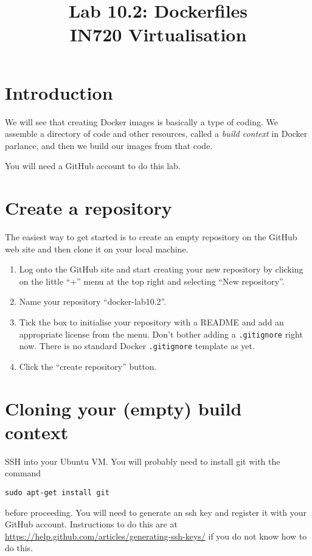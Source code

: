 \documentclass{article}
\begin{document}
\title{Lab 10.2: Dockerfiles\\ IN720 Virtualisation}
\date{}
\maketitle

\section*{Introduction}
We will  see that creating Docker images is basically a type of coding.  We assemble a directory of code and other resources, called a \emph{build context} in Docker parlance, and then we build our images from that code.  

You will need a GitHub account to do this lab.

\section{Create a repository}
The easiest way to get started is to create an empty repository on the GitHub web site and then clone it on your local machine.  
\begin{enumerate}
	\item Log onto the GitHub site and start creating your new repository by clicking on the little ``+'' menu at the top right and selecting ``New repository''.
	\item Name your repository ``docker-lab10.2''. 
	\item Tick the box to initialise your repository with a README and add an appropriate license from the menu.  Don't bother adding a \texttt{.gitignore} right now.  There is no standard Docker \texttt{.gitignore} template as yet.
	\item Click the ``create repository'' button.
\end{enumerate}
     


\section{Cloning your (empty) build context}
SSH into your Ubuntu VM. You will probably need to install git with the command

\texttt{sudo apt-get install git}

before proceeding.  You will need to generate an ssh key and register it with your GitHub account.  Instructions to do this are at \url{https://help.github.com/articles/generating-ssh-keys/} if you do not know how to do this.
\end{document}
